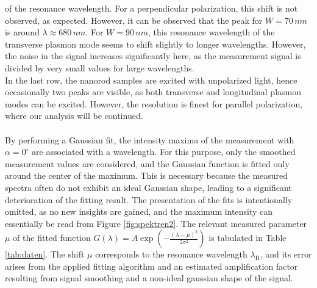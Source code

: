 of the resonance wavelength. 
For a perpendicular polarization, this shift is not observed, as expected. 
However, it can be observed that the peak for $W=70\,\si{nm}$ is around $\lambda\approx 680\,\si{nm}$. 
For $W=90\,\si{nm}$, this resonance wavelength of the transverse plasmon mode seems to shift 
slightly to longer wavelengths. 
However, the noise in the signal increases significantly here, as the measurement signal 
is divided by very small values for large wavelengths. \\
In the last row, the nanorod samples are excited with unpolarized light, 
hence occasionally two peaks are visible, as both transverse and longitudinal plasmon modes can be excited. 
However, the resolution is finest for parallel polarization, where our analysis will be continued. \\ \\
By performing a Gaussian fit, the intensity maxima of the measurement with $\alpha = 0^{\circ}$ are 
associated with a wavelength. For this purpose, only the smoothed measurement values are considered, 
and the Gaussian function is fitted only around the center of the maximum. 
This is necessary because the measured spectra often do not exhibit an ideal Gaussian shape, 
leading to a significant deterioration of the fitting result. The presentation of the fits is 
intentionally omitted, as no new insights are gained, and the maximum intensity can essentially 
be read from Figure \ref{fig:spektren2}. 
The relevant measured parameter $\mu$ of the 
fitted function $G(\lambda) = A\exp\left(-\frac{(\lambda-\mu)^{2}}{2\sigma^{2}}\right)$ is tabulated 
in Table \ref{tab:daten}. 
The shift $\mu$ corresponds to the resonance wavelength $\lambda_{\text{R}}$, and its error arises from
the applied fitting algorithm and an estimated amplification factor 
resulting from signal smoothing and a non-ideal gaussian shape of the signal. \\
